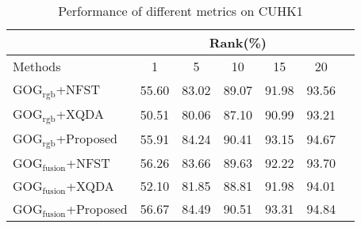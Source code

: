 \documentclass[conference,compsoc]{IEEEtran}
\begin{document}
\begin{table}[H]
\caption{Performance of different metrics on CUHK1}
\centering
\begin{tabular}{|l|c|c|c|c|c|c|}
\hline
& \multicolumn{5}{|c|}{Rank(\%)} \\
\hline
Methods& 1 & 5 &10&15& 20\\
\hline
GOG$_\text{rgb}$+NFST&55.60 &83.02 &89.07 &91.98&93.56 \\ 
\hline
GOG$_\text{rgb}$+XQDA&50.51 &80.06 &87.10 &90.99&93.21 \\ 
\hline
GOG$_\text{rgb}$+Proposed&55.91&84.24&90.41& 93.15&94.67\\  %
\hline
GOG$_\text{fusion}$+NFST&56.26 &83.66 &89.63 &92.22&93.70 \\ 
\hline
GOG$_\text{fusion}$+XQDA&52.10 &81.85&88.81 &91.98&94.01\\ 
\hline
GOG$_\text{fusion}$+Proposed&56.67&84.49& 90.51& 93.31&94.84\\

\hline

\end{tabular}\newline
\end{table}


\end{document}
